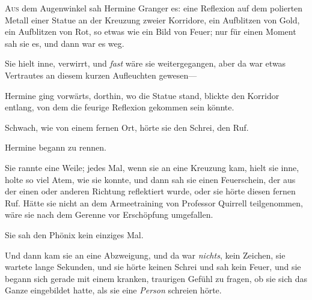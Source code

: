 
\lettrine{A}{us} dem Augenwinkel sah Hermine Granger es: eine Reflexion auf dem polierten Metall einer Statue an der Kreuzung zweier Korridore, ein Aufblitzen von Gold, ein Aufblitzen von Rot, so etwas wie ein Bild von Feuer; nur für einen Moment sah sie es, und dann war es weg.

Sie hielt inne, verwirrt, und \emph{fast} wäre sie weitergegangen, aber da war etwas Vertrautes an diesem kurzen Aufleuchten gewesen—

Hermine ging vorwärts, dorthin, wo die Statue stand, blickte den Korridor entlang, von dem die feurige Reflexion gekommen sein könnte.

Schwach, wie von einem fernen Ort, hörte sie den Schrei, den Ruf.

Hermine begann zu rennen.

Sie rannte eine Weile; jedes Mal, wenn sie an eine Kreuzung kam, hielt sie inne, holte so viel Atem, wie sie konnte, und dann sah sie einen Feuerschein, der aus der einen oder anderen Richtung reflektiert wurde, oder sie hörte diesen fernen Ruf. Hätte sie nicht an dem Armeetraining von Professor Quirrell teilgenommen, wäre sie nach dem Gerenne vor Erschöpfung umgefallen.

Sie sah den Phönix kein einziges Mal.

Und dann kam sie an eine Abzweigung, und da war \emph{nichts}, kein Zeichen, sie wartete lange Sekunden, und sie hörte keinen Schrei und sah kein Feuer, und sie begann sich gerade mit einem kranken, traurigen Gefühl zu fragen, ob sie sich das Ganze eingebildet hatte, als sie eine \emph{Person} schreien hörte.

